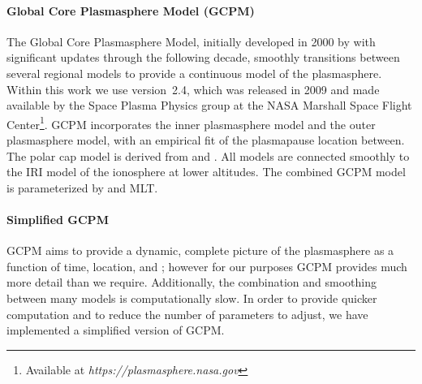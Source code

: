 \paragraph{Global Core Plasmasphere Model (GCPM)}
\label{section:gcpm}
The Global Core Plasmasphere Model, initially developed in 2000 by \cite{Gallagher1999} with significant updates through the following decade, smoothly transitions between several regional models to provide a continuous model of the plasmasphere. Within this work we use version~2.4, which was released in 2009 and made available by the Space Plasma Physics group at the NASA Marshall Space Flight Center\footnote{Available at \emph{https://plasmasphere.nasa.gov}}. GCPM incorporates the \cite{Carpenter1992} inner plasmasphere model and the \cite{Gallagher1995} outer plasmasphere model, with an empirical fit of the plasmapause location between. The polar cap model is derived from \cite{Persoon1983} and \cite{Chandler1991}. All models are connected smoothly to the IRI model of the ionosphere at lower altitudes. The combined GCPM model is parameterized by \kp{} and MLT.

\paragraph{Simplified GCPM}

GCPM aims to provide a dynamic, complete picture of the plasmasphere as a function of time, location, and \kp{}; however for our purposes GCPM provides much more detail than we require. Additionally, the combination and smoothing between many models is computationally slow. In order to provide quicker computation and to reduce the number of parameters to adjust, we have implemented a simplified version of GCPM.

